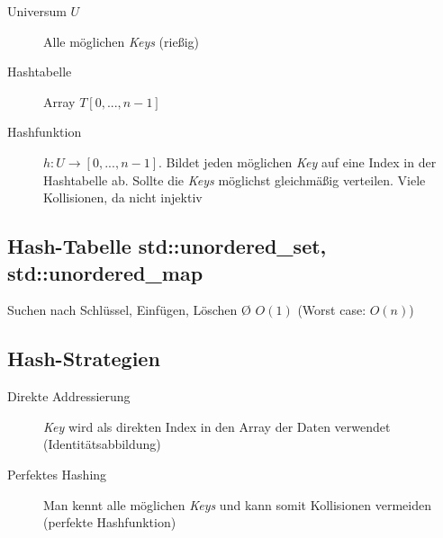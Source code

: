 \begin{description}
    \item[Universum $U$] Alle möglichen \textit{Keys} (rießig)
    \item[Hashtabelle] Array $T[0,...,n-1]$
    \item[Hashfunktion] $h: U \rightarrow [0,...,n-1]$. Bildet jeden möglichen \textit{Key} auf eine Index in der Hashtabelle ab. Sollte die \textit{Keys} möglichst gleichmäßig verteilen. Viele Kollisionen, da nicht injektiv
\end{description}

\subsection{Hash-Tabelle std::unordered\_set, std::unordered\_map}
Suchen nach Schlüssel, Einfügen, Löschen Ø $O(1)$ (Worst case: $O(n)$)

\begin{sectionbox}
    \subsection{Hash-Strategien}
    \begin{description}
        \item[Direkte Addressierung] \textit{Key} wird als direkten Index in den Array der Daten verwendet (Identitätsabbildung)
        \item[Perfektes Hashing] Man kennt alle möglichen \textit{Keys} und kann somit Kollisionen vermeiden (perfekte Hashfunktion)
    \end{description}
\end{sectionbox}

